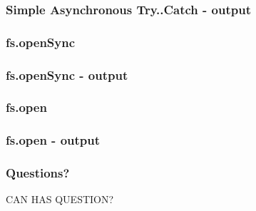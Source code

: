 \documentclass[16pt]{beamer}
\begin{document}
\begin{frame}[fragile]
  \frametitle{Simple Asynchronous Try..Catch - output}
  \begin{scriptsize}
    
  \end{scriptsize}
\end{frame}

\begin{frame}[fragile]
  \frametitle{fs.openSync}
  \begin{footnotesize}
    
  \end{footnotesize}
\end{frame}

\begin{frame}[fragile]
  \frametitle{fs.openSync - output}
  \begin{scriptsize}
    
  \end{scriptsize}
\end{frame}

\begin{frame}[fragile]
  \frametitle{fs.open}
  \begin{footnotesize}
    
  \end{footnotesize}
\end{frame}

\begin{frame}[fragile]
  \frametitle{fs.open - output}
  \begin{scriptsize}
    
  \end{scriptsize}
\end{frame}

\begin{frame}
  \frametitle{Questions?}
  \begin{center}
    CAN HAS QUESTION?
  \end{center}
\end{frame}
\end{document}

